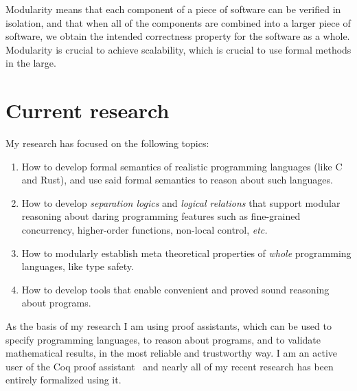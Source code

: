 \documentclass[sigplan]{acmart}
\newcommand{\etc}{\textit{etc.}\xspace}
\begin{document}
Modularity means that each component of a piece of software can be verified
in isolation, and that when all of the components are combined into a larger
piece of software, we obtain the intended correctness property for the
software as a whole.
Modularity is crucial to achieve scalability, which is crucial
to use formal methods in the large.

\section{Current research}
My research has focused on the following topics:

\begin{enumerate}
\item How to develop formal semantics of realistic programming languages (like
  C and Rust), and use said formal semantics to reason about such languages.
\item How to develop \emph{separation logics} and \emph{logical relations}
  that support modular reasoning
  about daring programming features such as
  fine-grained concurrency, higher-order functions, non-local control, \etc
\item How to modularly establish meta theoretical properties of \emph{whole} programming
  languages, like type safety.
\item How to develop tools that enable convenient and proved sound reasoning
  about programs.
\end{enumerate}

As the basis of my research I am using proof assistants, which can be used
to specify programming languages, to reason about programs, and
to validate mathematical results, in the most reliable and trustworthy way.
I am an active user of the Coq proof assistant~\cite{coq} and nearly all of
my recent research has been entirely formalized using it.
\end{document}
